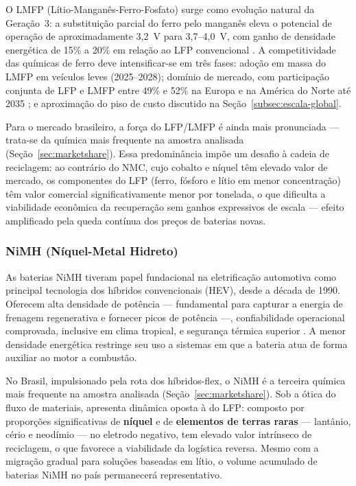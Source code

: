 O LMFP (Lítio-Manganês-Ferro-Fosfato) surge como evolução natural da Geração~3:
a substituição parcial do ferro pelo manganês eleva o potencial de operação de
aproximadamente 3,2~V para 3,7--4,0~V, com ganho de densidade energética de 15\%
a 20\% em relação ao LFP convencional \cite{EUROBAT}. A competitividade das
químicas de ferro deve intensificar-se em três fases: adoção em massa do LMFP em
veículos leves (2025--2028); domínio de mercado, com participação conjunta de LFP
e LMFP entre 49\% e 52\% na Europa e na América do Norte até 2035
\cite{McKinsey2026}; e aproximação do piso de custo discutido na
Seção~\ref{subsec:escala-global}.

Para o mercado brasileiro, a força do LFP/LMFP é ainda mais pronunciada — trata-se
da química mais frequente na amostra analisada (Seção~\ref{sec:marketshare}).
Essa predominância impõe um desafio à cadeia de reciclagem: ao contrário do NMC,
cujo cobalto e níquel têm elevado valor de mercado, os componentes do LFP (ferro,
fósforo e lítio em menor concentração) têm valor comercial significativamente
menor por tonelada, o que dificulta a viabilidade econômica da recuperação sem
ganhos expressivos de escala — efeito amplificado pela queda contínua dos preços
de baterias novas.

\subsubsection{NiMH (Níquel-Metal Hidreto)}
\label{subsec:nimh}

As baterias NiMH tiveram papel fundacional na eletrificação automotiva como
principal tecnologia dos híbridos convencionais (HEV), desde a década de 1990.
Oferecem alta densidade de potência — fundamental para capturar a energia de
frenagem regenerativa e fornecer picos de potência —, confiabilidade operacional
comprovada, inclusive em clima tropical, e segurança térmica superior
\cite{McKinsey2026}. A menor densidade energética restringe seu uso a sistemas
em que a bateria atua de forma auxiliar ao motor a combustão.

No Brasil, impulsionado pela rota dos híbridos-flex, o NiMH é a terceira química
mais frequente na amostra analisada (Seção~\ref{sec:marketshare}). Sob a ótica do
fluxo de materiais, apresenta dinâmica oposta à do LFP: composto por proporções
significativas de \textbf{níquel} e de \textbf{elementos de terras raras} —
lantânio, cério e neodímio — no eletrodo negativo, tem elevado valor intrínseco
de reciclagem, o que favorece a viabilidade da logística reversa. Mesmo com a
migração gradual para soluções baseadas em lítio, o volume acumulado de baterias
NiMH no país permanecerá representativo.


